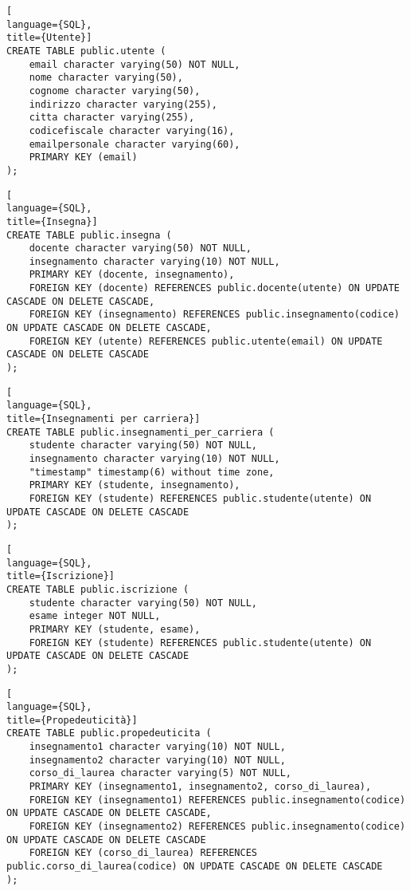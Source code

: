 \documentclass{article}
\begin{document}
\begin{lstlisting}[
language={SQL},
title={Utente}]
CREATE TABLE public.utente (
    email character varying(50) NOT NULL,
    nome character varying(50),
    cognome character varying(50),
    indirizzo character varying(255),
    citta character varying(255),
    codicefiscale character varying(16),
    emailpersonale character varying(60),
    PRIMARY KEY (email)
);
\end{lstlisting}

\begin{lstlisting}[
language={SQL},
title={Insegna}]
CREATE TABLE public.insegna (
    docente character varying(50) NOT NULL,
    insegnamento character varying(10) NOT NULL,
    PRIMARY KEY (docente, insegnamento),
    FOREIGN KEY (docente) REFERENCES public.docente(utente) ON UPDATE CASCADE ON DELETE CASCADE,
    FOREIGN KEY (insegnamento) REFERENCES public.insegnamento(codice) ON UPDATE CASCADE ON DELETE CASCADE,
    FOREIGN KEY (utente) REFERENCES public.utente(email) ON UPDATE CASCADE ON DELETE CASCADE
);
\end{lstlisting}

\begin{lstlisting}[
language={SQL},
title={Insegnamenti per carriera}]
CREATE TABLE public.insegnamenti_per_carriera (
    studente character varying(50) NOT NULL,
    insegnamento character varying(10) NOT NULL,
    "timestamp" timestamp(6) without time zone,
    PRIMARY KEY (studente, insegnamento),
    FOREIGN KEY (studente) REFERENCES public.studente(utente) ON UPDATE CASCADE ON DELETE CASCADE
);
\end{lstlisting}

\begin{lstlisting}[
language={SQL},
title={Iscrizione}]
CREATE TABLE public.iscrizione (
    studente character varying(50) NOT NULL,
    esame integer NOT NULL,
    PRIMARY KEY (studente, esame),
    FOREIGN KEY (studente) REFERENCES public.studente(utente) ON UPDATE CASCADE ON DELETE CASCADE
);
\end{lstlisting}

\begin{lstlisting}[
language={SQL},
title={Propedeuticità}]
CREATE TABLE public.propedeuticita (
    insegnamento1 character varying(10) NOT NULL,
    insegnamento2 character varying(10) NOT NULL,
    corso_di_laurea character varying(5) NOT NULL,
    PRIMARY KEY (insegnamento1, insegnamento2, corso_di_laurea),
    FOREIGN KEY (insegnamento1) REFERENCES public.insegnamento(codice) ON UPDATE CASCADE ON DELETE CASCADE,
    FOREIGN KEY (insegnamento2) REFERENCES public.insegnamento(codice) ON UPDATE CASCADE ON DELETE CASCADE
    FOREIGN KEY (corso_di_laurea) REFERENCES public.corso_di_laurea(codice) ON UPDATE CASCADE ON DELETE CASCADE
);
\end{lstlisting}
\end{document}
